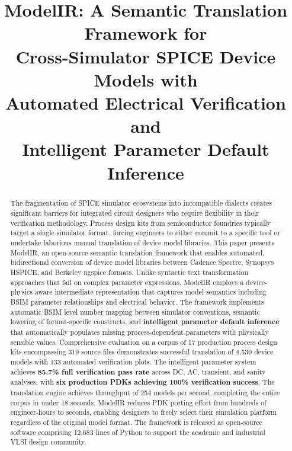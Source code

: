\documentclass[conference]{IEEEtran}
\begin{document}
\title{ModelIR: A Semantic Translation Framework for \\Cross-Simulator SPICE Device Models with\\Automated Electrical Verification and \\Intelligent Parameter Default Inference}

\author{
}

\maketitle

\begin{abstract}
The fragmentation of SPICE simulator ecosystems into incompatible dialects creates significant barriers for integrated circuit designers who require flexibility in their verification methodology. Process design kits from semiconductor foundries typically target a single simulator format, forcing engineers to either commit to a specific tool or undertake laborious manual translation of device model libraries. This paper presents ModelIR, an open-source semantic translation framework that enables automated, bidirectional conversion of device model libraries between Cadence Spectre, Synopsys HSPICE, and Berkeley ngspice formats. Unlike syntactic text transformation approaches that fail on complex parameter expressions, ModelIR employs a device-physics-aware intermediate representation that captures model semantics including BSIM parameter relationships and electrical behavior. The framework implements automatic BSIM level number mapping between simulator conventions, semantic lowering of format-specific constructs, and \textbf{intelligent parameter default inference} that automatically populates missing process-dependent parameters with physically sensible values. Comprehensive evaluation on a corpus of 17 production process design kits encompassing 319 source files demonstrates successful translation of 4,530 device models with 133 automated verification plots. The intelligent parameter system achieves \textbf{85.7\% full verification pass rate} across DC, AC, transient, and sanity analyses, with \textbf{six production PDKs achieving 100\% verification success}. The translation engine achieves throughput of 254 models per second, completing the entire corpus in under 18 seconds. ModelIR reduces PDK porting effort from hundreds of engineer-hours to seconds, enabling designers to freely select their simulation platform regardless of the original model format. The framework is released as open-source software comprising 12,683 lines of Python to support the academic and industrial VLSI design community.
\end{abstract}
\end{document}
